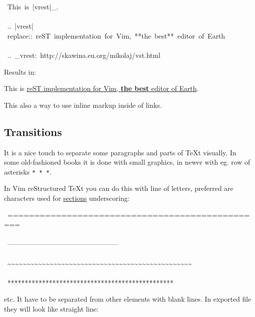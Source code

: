 \documentclass[12pt]{article}
\begin{document}
\begin{ttfamily}\begin{flushleft}
\mbox{~This~is~|vrest|\_.}\\
\mbox{}\\
\mbox{~..~|vrest|~replace::~reST~implementation~for~Vim,~**the~best**~editor~of~Earth}\\
\mbox{}\\
\mbox{~..~\_vrest:~http://skawina.eu.org/mikolaj/vst.html}\\
\end{flushleft}\end{ttfamily}

Results in:

This is \href{http://skawina.eu.org/mikolaj/vst.html}{reST implementation for Vim, \textbf{the best} editor of Earth}.

This also a way to use inline markup inside of links.

\hypertarget{ltransitions}{}
\subsection{Transitions}

It is a nice touch to separate some paragraphs and parts of \TeX{}t
visually. In some old-fashioned books it is done with small graphics, in
newer with eg. row of asterisks \texttt{* * *}.

In Vim reStructured \TeX{}t you can do this with line of letters, preferred are characters
used for \href{\#lsections}{sections} underscoring:

\begin{ttfamily}\begin{flushleft}
\mbox{~================================================}\\
\mbox{}\\
\mbox{~------------------------------------------------}\\
\mbox{}\\
\mbox{~\~{}\~{}\~{}\~{}\~{}\~{}\~{}\~{}\~{}\~{}\~{}\~{}\~{}\~{}\~{}\~{}\~{}\~{}\~{}\~{}\~{}\~{}\~{}\~{}\~{}\~{}\~{}\~{}\~{}\~{}\~{}\~{}\~{}\~{}\~{}\~{}\~{}\~{}\~{}\~{}\~{}\~{}\~{}\~{}\~{}\~{}\~{}\~{}}\\
\mbox{}\\
\mbox{~************************************************}\\
\end{flushleft}\end{ttfamily}

etc. It have to be separated from other elements with blank lines. In
exported file they will look like straight line:
\end{document}
